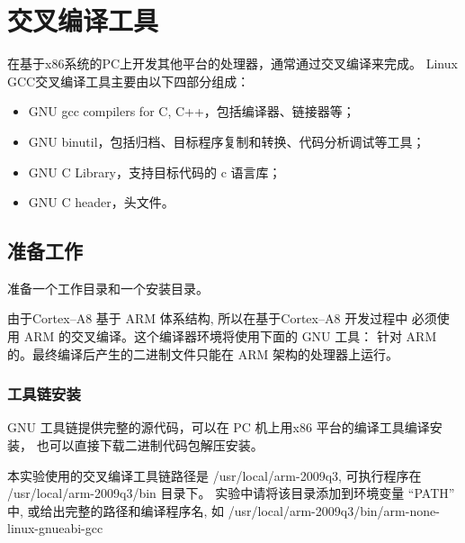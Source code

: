 \chapter{交叉编译工具}

  在基于x86系统的PC上开发其他平台的处理器，通常通过交叉编译来完成。
Linux GCC交叉编译工具主要由以下四部分组成：

\begin{itemize}
  \item GNU gcc compilers for C, C++，包括编译器、链接器等；
  \item GNU binutil，包括归档、目标程序复制和转换、代码分析调试等工具；
  \item GNU C Library，支持目标代码的 c 语言库；
  \item GNU C header，头文件。
\end{itemize}

\section{准备工作}
  准备一个工作目录和一个安装目录。

	由于Cortex--A8 基于 ARM 体系结构, 所以在基于Cortex--A8 开发过程中
必须使用 ARM 的交叉编译。这个编译器环境将使用下面的 GNU 工具：
针对 ARM 的。最终编译后产生的二进制文件只能在 ARM 架构的处理器上运行。

\subsection{工具链安装}
	GNU 工具链提供完整的源代码，可以在 PC 机上用x86 平台的编译工具编译安装，
也可以直接下载二进制代码包解压安装。

	本实验使用的交叉编译工具链路径是 /usr/local/arm-2009q3, 可执行程序在
 /usr/local/arm-2009q3/bin 目录下。 实验中请将该目录添加到环境变量 ``PATH''
中, 或给出完整的路径和编译程序名, 如
/usr/local/arm-2009q3/bin/arm-none-linux-gnueabi-gcc
